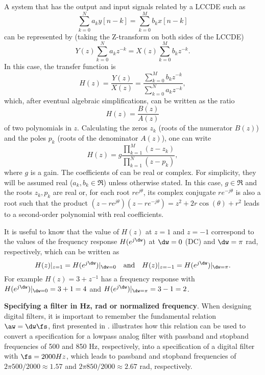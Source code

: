 A system that has the output and input signals related by a LCCDE such as
\begin{equation}
\sum_{k=0}^N a_k y[n-k] = \sum_{k=0}^M b_k x[n-k]
\label{eq:lccde}
\end{equation}
can be represented by (taking the Z-transform on both sides of the LCCDE)
\[
Y(z) \sum_{k=0}^N a_k z^{-k} = X(z) \sum_{k=0}^M b_k z^{-k}.
\]
In this case, the transfer function is 
\begin{equation}
H(z) = \frac{Y(z)}{X(z)} = \frac{\sum_{k=0}^M b_k z^{-k}}{\sum_{k=0}^N a_k z^{-k}},
\label{eq:hz_transfer_function}
\end{equation}
which, after eventual algebraic simplifications, can be written as the ratio 
\begin{equation}
H(z)=\frac{B(z)}{A(z)}
\label{eq:transferfunction}
\end{equation}
of two polynomials in $z$. Calculating the zeros $z_k$ (roots of the numerator $B(z)$) and the poles $p_k$ (roots of the denominator $A(z)$), one can write
\[
H(z) = g \frac{\prod_{k=1}^M (z-z_k)}{\prod_{k=1}^N (z-p_k)},
\]
where $g$ is a gain. The coefficients of  can be real or complex. For simplicity, they will be assumed real ($a_k, b_k \in \Re$) unless otherwise stated. In this case, $g \in \Re$ and the roots $z_k, p_k$ are real or, for each root $r e^{j\theta}$, its complex conjugate $r e^{-j\theta}$ is also a root such that the product $(z-re^{j\theta})(z-re^{-j\theta})=z^2+2r\cos(\theta)+r^2$ leads to a second-order polynomial with real coefficients.

It is useful to know that the value of $H(z)$ at $z=1$ and $z=-1$ correspond to the values of the frequency response $H(e^{j\dw})$ at $\dw=0$ (DC) and $\dw=\pi$ rad, respectively, which can be written as
\begin{equation}
H(z)|_{z=1} = H(e^{j\dw})|_{\dw=0} \textrm{~~~and~~~} H(z)|_{z=-1} = H(e^{j\dw})|_{\dw=\pi}.
\label{eq:z_dc_nyquist_freqs}
\end{equation}
For example $H(z)=3+z^{-1}$ has a frequency response with $H(e^{j\dw})|_{\dw=0} = 3+1=4$ and $H(e^{j\dw})|_{\dw=\pi} = 3-1=2$.

\bExample \textbf{Specifying a filter in Hz, rad or normalized frequency}.
When designing digital filters, it is important to remember the fundamental relation $\aw = \dw \fs$, first presented in .  illustrates how this relation can be used to convert a specification for a lowpass analog filter with passband and stopband frequencies of 500 and 850 Hz, respectively, into a specification of a digital filter with $\fs=2000 Hz$, which leads to passband and stopband frequencies of $2 \pi 500 / 2000 \approx 1.57$ and $2 \pi 850 / 2000 \approx 2.67$ rad, respectively.

